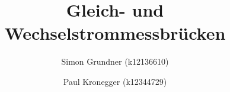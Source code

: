 \documentclass[a4paper,oneside,11pt,ngerman]{scrartcl}
\begin{document}
\title{Gleich- und Wechselstrommessbrücken}
\author{Simon Grundner (k12136610) \and Paul Kronegger (k12344729)}


\tableofcontents












\end{document}
